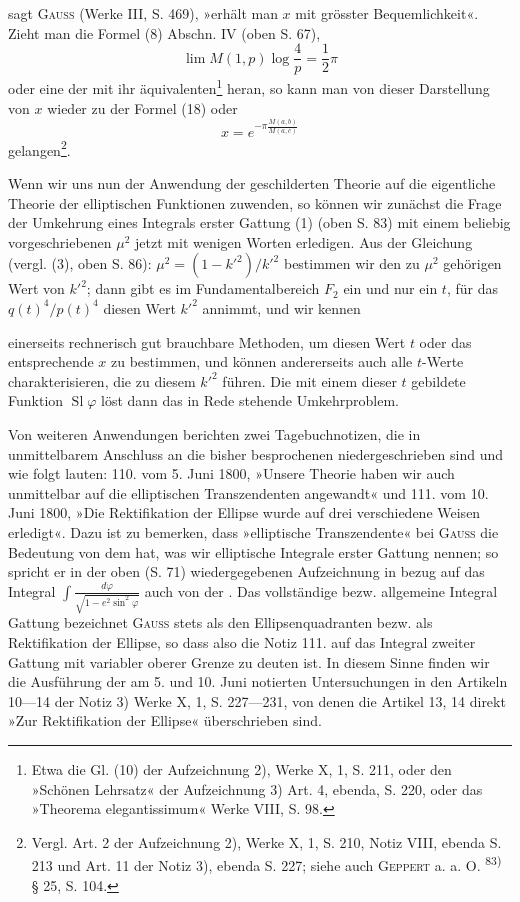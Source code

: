 sagt \textsc{Gauss} (Werke III, S. 469), »erhält man \(x\) mit grösster Bequemlichkeit«.
Zieht man die Formel (8) Abschn. IV (oben S. 67),
\[
\lim M(1,p)\log\frac4p=\frac12\pi
\]
\noindent oder eine der mit ihr äquivalenten\footnote{Etwa die Gl. (10) der Aufzeichnung 2), Werke X, 1, S. 211, oder den »Schönen Lehrsatz« der Aufzeichnung 3) Art. 4, ebenda, S. 220, oder das »Theorema elegantissimum« Werke VIII, S. 98.} heran, so kann man von dieser Darstellung
von \(x\) wieder zu der Formel (18) oder
\[
x=e^{-\pi\frac{M(a,b)}{M(a,c)}}
\]
\noindent gelangen\footnote{Vergl. Art. 2 der Aufzeichnung 2), Werke X, 1, S. 210, Notiz VIII, ebenda S. 213 und Art. 11 der Notiz 3), ebenda S. 227; siehe auch \textsc{Geppert} a. a. O. \textsuperscript{83)} § 25, S. 104.}.

Wenn wir uns nun der Anwendung der geschilderten Theorie auf die
eigentliche Theorie der elliptischen Funktionen zuwenden, so können wir zunächst
die Frage der Umkehrung eines Integrals erster Gattung (1) (oben
S. 83) mit einem beliebig vorgeschriebenen \(\mu^2\) jetzt mit wenigen Worten erledigen.
Aus der Gleichung (vergl. (3), oben S. 86): \(\mu^2=(1-k'^2)/k'^2\) bestimmen
wir den zu \(\mu^2\) gehörigen Wert von \(k'^2\); dann gibt es im Fundamentalbereich \(F_2\)
ein und nur ein \(t\), für das \(q(t)^4/p(t)^4\) diesen Wert \(k'^2\) annimmt, und wir kennen\par
\clearpage{}
\noindent einerseits rechnerisch gut brauchbare Methoden, um diesen Wert \(t\) oder das
entsprechende \(x\) zu bestimmen, und können andererseits auch alle \(t\)-Werte
charakterisieren, die zu diesem \(k'^2\) führen. Die mit einem dieser \(t\) gebildete
Funktion \(\operatorname{Sl}\varphi\) löst dann das in Rede stehende Umkehrproblem.

Von weiteren Anwendungen berichten zwei Tagebuchnotizen, die in unmittelbarem
Anschluss an die bisher besprochenen niedergeschrieben sind und
wie folgt lauten: 110. vom 5. Juni 1800, »Unsere Theorie haben wir auch
unmittelbar auf die elliptischen Transzendenten angewandt« und 111. vom
10. Juni 1800, »Die Rektifikation der Ellipse wurde auf drei verschiedene
Weisen erledigt«. Dazu ist zu bemerken, dass »elliptische Transzendente« bei
\textsc{Gauss} die Bedeutung von dem hat, was wir elliptische Integrale erster Gattung
nennen; so spricht er in der oben (S. 71) wiedergegebenen Aufzeichnung in
bezug auf das Integral \(\displaystyle\int\frac{d\varphi}{\sqrt{1-e^2\sin^2\varphi}}\) auch von der .
Das vollständige bezw. allgemeine Integral  Gattung bezeichnet \textsc{Gauss}
stets als den Ellipsenquadranten bezw. als Rektifikation der Ellipse, so dass
also die Notiz 111. auf das Integral zweiter Gattung mit variabler oberer
Grenze zu deuten ist. In diesem Sinne finden wir die Ausführung der am
5. und 10. Juni notierten Untersuchungen in den Artikeln 10—14 der Notiz 3)
Werke X, 1, S. 227—231, von denen die Artikel 13, 14 direkt »Zur Rektifikation
der Ellipse« überschrieben sind.

